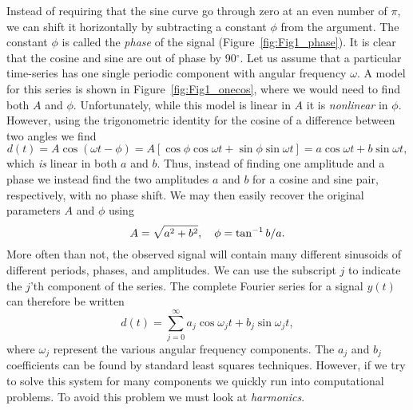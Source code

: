 Instead of requiring that the sine curve go 
through zero at an even number of $\pi$, we can shift it horizontally by subtracting a constant $\phi$  
from the argument.
The constant $\phi$ is called the \emph{phase} of the signal (Figure~\ref{fig:Fig1_phase}).
It is clear that the cosine and sine are out of phase 
by 90$^\circ$.  Let us assume that a particular time-series has one single periodic component with angular 
frequency $\omega$.  A model for this series is shown in Figure~\ref{fig:Fig1_onecos},
where we would need to find both $A$ and $\phi$.  Unfortunately, while this model is linear in $A$ it is \emph{nonlinear} 
in $\phi$.  However, using the trigonometric identity for the cosine of a difference between two angles we find
\noindent
\begin{equation}
d(t) = A\cos (\omega t -\phi ) = A [ \cos \phi \cos \omega t + \sin \phi \sin \omega t ] = a \cos \omega t + b \sin \omega t,
\label{eq:sinusoid}
\end{equation}
which \emph{is} linear in both $a$ and $b$.  Thus, instead of finding one amplitude and a phase we instead find the two 
amplitudes $a$ and $b$ for a cosine and sine pair, respectively, with no phase shift.  We may then easily recover the original
parameters $A$ and  $\phi$ using
\begin{equation}
	\index{Sinusoid!amplitude}
	\index{Amplitude!sinusoid}
	\index{Sinusoid!phase}
	\index{Phase!sinusoid}
A = \sqrt{a^2 + b^2 }, \quad \phi = \tan^{-1} b/a.
\end{equation}
	More often than not, the observed signal will contain many different sinusoids of different 
periods, phases, and amplitudes.  We can use the subscript $j$ to indicate the $j$'th component of the 
series.  The complete Fourier series for a signal $y(t)$ can therefore be written
\begin{equation}
d(t) =  \sum^\infty_{j=0} a_{j} \cos \omega_{j}t + b_{j} \sin \omega_{j}t,
\end{equation}
where $\omega_j$ represent the various angular frequency components.  The $a_j$ and $b_j$ coefficients can be found 
by standard least squares techniques.  However, if we try to solve this system for many 
components we quickly run into computational problems.  To avoid this problem we must look 
at \emph{harmonics}.
